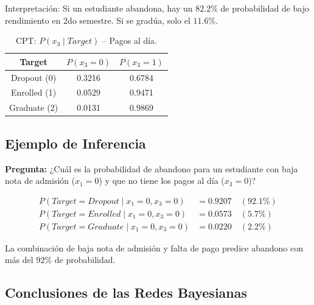 \documentclass[12pt,a4paper]{article}
\begin{document}
Interpretación: Si un estudiante abandona, hay un $82.2\%$ de probabilidad de bajo rendimiento en 2do semestre. Si se gradúa, solo el $11.6\%$.

\begin{table}[H]
    \centering
    \begin{tabular}{c|cc}
        \toprule
        \textbf{Target} & $P(x_3=0)$ & $P(x_3=1)$ \\
        \midrule
        Dropout (0) & 0.3216 & 0.6784 \\
        Enrolled (1) & 0.0529 & 0.9471 \\
        Graduate (2) & 0.0131 & 0.9869 \\
        \bottomrule
    \end{tabular}
    \caption{CPT: $P(x_3 \mid Target)$ -- Pagos al día.}
\end{table}

\subsection{Ejemplo de Inferencia}

\textbf{Pregunta:} ¿Cuál es la probabilidad de abandono para un estudiante con baja nota de admisión ($x_1 = 0$) y que no tiene los pagos al día ($x_3 = 0$)?

\begin{align*}
    P(Target = Dropout \mid x_1 = 0, x_3 = 0) &= 0.9207 \quad (92.1\%) \\
    P(Target = Enrolled \mid x_1 = 0, x_3 = 0) &= 0.0573 \quad (5.7\%) \\
    P(Target = Graduate \mid x_1 = 0, x_3 = 0) &= 0.0220 \quad (2.2\%)
\end{align*}

La combinación de baja nota de admisión y falta de pago predice abandono con más del $92\%$ de probabilidad.

\subsection{Conclusiones de las Redes Bayesianas}
\end{document}
